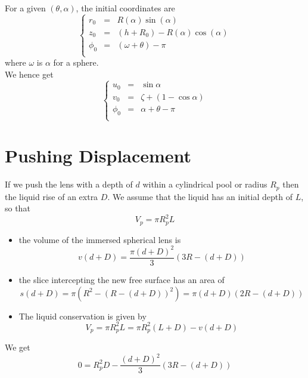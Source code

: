 \documentclass[aps,onecolumn]{revtex4}
\begin{document}
For a given $(\theta,\alpha)$, the initial coordinates are
\begin{equation}
\left\lbrace
\begin{array}{rcl}
	r_0    & = & R(\alpha) \sin(\alpha)\\
	z_0    & = & (h + R_0) - R(\alpha) \cos(\alpha)\\
	\phi_0 & = & \left(\omega + \theta\right) - \pi\\
\end{array}
\right. 
\end{equation}
where $\omega$ is $\alpha$ for a sphere.\\
We hence get
\begin{equation}
\left\lbrace
\begin{array}{rcl}
	u_0    & = & \sin\alpha\\
	v_0    & = & \zeta + (1-\cos\alpha)\\
	\phi_0 & = & \alpha+\theta-\pi\\
\end{array}
\right.
\end{equation}

\section{Pushing Displacement}
If we push the lens with a depth of $d$ within a cylindrical pool or radius $R_p$ then the
liquid rise of an extra $D$. We assume that the liquid has an initial depth of $L$,
so that
\begin{equation}
	V_p = \pi R_p^2 L
\end{equation}

\begin{itemize}
	\item the volume of the immersed spherical lens is
	\begin{equation}
		v(d+D) = \dfrac{\pi (d+D)^2}{3}\left(3R-(d+D)\right)
	\end{equation}
	\item the slice intercepting the new free surface has an area of
	\begin{equation}
		s(d+D) = \pi \left( R^2 - (R-(d+D))^2\right) = \pi (d+D) \left(2R-(d+D)\right)
	\end{equation}
	\item The liquid conservation is given by
	\begin{equation}
	V_p = \pi R_p^2 L = \pi R_p^2 (L+D) - v(d+D)
	\end{equation}
\end{itemize}
We get
\begin{equation}
		0 =  R_p^2 D - \dfrac{(d+D)^2}{3}\left(3R-(d+D)\right)
\end{equation}
\end{document}

